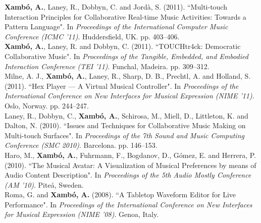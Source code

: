 \documentclass[10pt, a4paper]{article}
\newcommand{\years}[1]{\marginnote{\scriptsize #1}}
\begin{document}
\years{2011c}\textbf{Xambó, A.}, Laney, R., Dobbyn, C. and Jordà, S. (2011). “Multi-touch Interaction Principles for Collaborative Real-time Music Activities: Towards a Pattern Language". In \emph{Proceedings of the International Computer Music Conference (ICMC '11)}. Huddersfield, UK. pp. 403--406.\\
\years{2011b}\textbf{Xambó, A.}, Laney, R. and Dobbyn, C. (2011). “TOUCHtr4ck: Democratic Collaborative Music". In \emph{Proceedings of the Tangible, Embedded, and Embodied Interaction Conference (TEI '11)}. Funchal, Madeira. pp. 309--312.\\
\years{2011a}Milne, A. J., \textbf{Xambó, A.}, Laney, R., Sharp, D. B., Prechtl, A. and Holland, S. (2011). “Hex Player — A Virtual Musical Controller". In \emph{Proceedings of the International Conference on New Interfaces for Musical Expression (NIME '11)}. Oslo, Norway. pp. 244--247.\\
\years{2010b}Laney, R., Dobbyn, C., \textbf{Xambó, A.}, Schirosa, M., Miell, D., Littleton, K. and Dalton, N. (2010). “Issues and Techniques for Collaborative Music Making on Multi-touch Surfaces". In \emph{Proceedings of the 7th Sound and Music Computing Conference (SMC 2010)}. Barcelona. pp. 146–153.\\
\years{2010a}Haro, M., \textbf{Xambó, A.}, Fuhrmann, F., Bogdanov, D., Gómez, E. and Herrera, P. (2010). “The Musical Avatar: A Visualization of Musical Preferences by means of Audio Content Description". In \emph{Proceedings of the 5th Audio Mostly Conference (AM '10)}. Piteå, Sweden.\\
\years{2008}Roma, G. and \textbf{Xambó, A.} (2008). “A Tabletop Waveform Editor for Live Performance". In \emph{Proceedings of the International Conference on New Interfaces for Musical Expression (NIME '08)}. Genoa, Italy.
\end{document}
